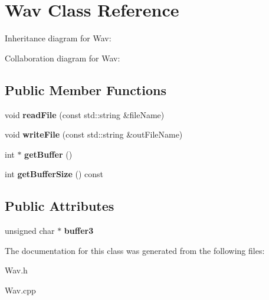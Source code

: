\hypertarget{classWav}{}\section{Wav Class Reference}
\label{classWav}


Inheritance diagram for Wav\+:


Collaboration diagram for Wav\+:
\subsection*{Public Member Functions}
\begin{DoxyCompactItemize}
\item 
\mbox{\label{classWav_a1c4230cec49d30147a5b8a1950083f7c}} 
void {\bfseries read\+File} (const std\+::string \&file\+Name)
\item 
\mbox{\label{classWav_ad86f4a21d36719ae375ea2586f9f591f}} 
void {\bfseries write\+File} (const std\+::string \&out\+File\+Name)
\item 
\mbox{\label{classWav_a16d832140b12926cd3191834ccb4ef9d}} 
int $\ast$ {\bfseries get\+Buffer} ()
\item 
\mbox{\label{classWav_a71fdfa1d9f5e7c1b86f07bbff4249dca}} 
int {\bfseries get\+Buffer\+Size} () const
\end{DoxyCompactItemize}
\subsection*{Public Attributes}
\begin{DoxyCompactItemize}
\item 
\mbox{\label{classWav_a5da0ffb604d409ff5c93e3c7b859a351}} 
unsigned char $\ast$ {\bfseries buffer3}
\end{DoxyCompactItemize}


The documentation for this class was generated from the following files\+:\begin{DoxyCompactItemize}
\item 
Wav.\+h\item 
Wav.\+cpp\end{DoxyCompactItemize}

